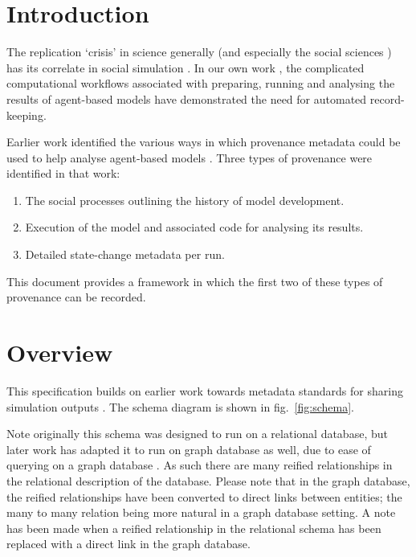 \documentclass[
]{article}
\providecommand{\tightlist}{%
  \setlength{\itemsep}{0pt}\setlength{\parskip}{0pt}}
\begin{document}
\section{Introduction}\label{introduction}

The replication `crisis' \citep{fanelli2018replication} in science
generally (and especially the social sciences
\citep{shrout2018replication}) has its correlate in social simulation
\citep{edmonds2003}. In our own work \citep{polhill2017lessons}, the
complicated computational workflows associated with preparing, running
and analysing the results of agent-based models have demonstrated the
need for automated record-keeping.

Earlier work identified the various ways in which provenance metadata
could be used to help analyse agent-based models
\citep{pignotti2013bigprov}. Three types of provenance were identified
in that work:

\begin{enumerate}
\def\labelenumi{\arabic{enumi}.}
\tightlist
\item
  The social processes outlining the history of model development.
\item
  Execution of the model and associated code for analysing its results.
\item
  Detailed state-change metadata per run.
\end{enumerate}

This document provides a framework in which the first two of these types
of provenance can be recorded.

\section{Overview}\label{overview}

This specification builds on earlier work towards metadata standards for
sharing simulation outputs \citep{polhill2014towards}. The schema
diagram is shown in fig.~\ref{fig:schema}.

Note originally this schema was designed to run on a relational
database, but later work has adapted it to run on graph database as
well, due to ease of querying on a graph database
\citep{davoudian2020big}. As such there are many reified relationships
in the relational description of the database. Please note that in the
graph database, the reified relationships have been converted to direct
links between entities; the many to many relation being more natural in
a graph database setting. A note has been made when a reified
relationship in the relational schema has been replaced with a direct
link in the graph database.
\end{document}
